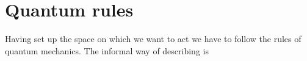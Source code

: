 \section{Quantum rules}
Having set up the space on which we want to act we have to follow the rules of quantum mechanics. The informal way of describing is 
